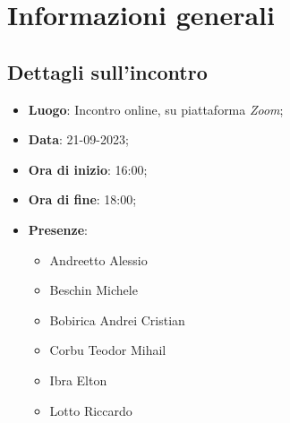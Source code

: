 \section{Informazioni generali}

\subsection{Dettagli sull'incontro}
\begin{itemize}
\item \textbf{Luogo}: Incontro online, su piattaforma \textit{Zoom\glo};
\item \textbf{Data}: 21-09-2023;
\item \textbf{Ora di inizio}: 16:00;
\item \textbf{Ora di fine}: 18:00;
\item \textbf{Presenze}: 
\begin{itemize}
	\item Andreetto Alessio
    \item Beschin Michele
    \item Bobirica Andrei Cristian
    \item Corbu Teodor Mihail
    \item Ibra Elton
    \item Lotto Riccardo 
\end{itemize}
\end{itemize}
